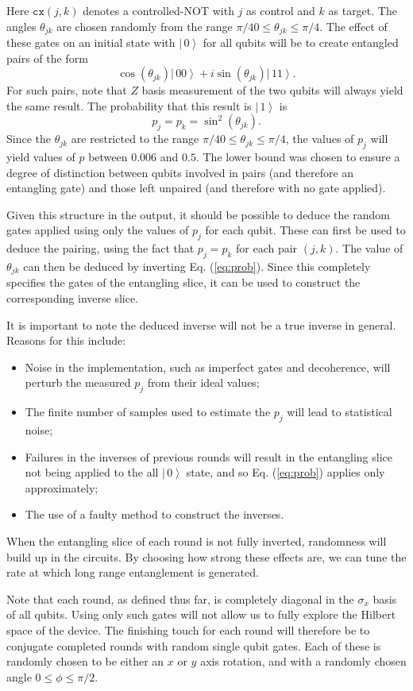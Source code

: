 \documentclass[aps,prl,twocolumn,showpacs,preprintnumbers]{revtex4-1}
\newcommand{\be}{\begin{equation}}
\newcommand{\ee}{\end{equation}}
\newcommand{\ket}[1]{\left | \, #1 \right\rangle}
\begin{document}
Here $\mathtt{cx}(j,k)$ denotes a controlled-NOT with $j$ as control and $k$ as target. The angles $\theta_{jk}$ are chosen randomly from the range $\pi/40 \leq \theta_{jk} \leq \pi/4$. The effect of these gates on an initial state with $\ket{0}$ for all qubits will be to create entangled pairs of the form
\be \label{state}
\cos (\theta_{jk}) \ket{00} + i \sin (\theta_{jk}) \ket{11} .
\ee
For such pairs, note that $Z$ basis measurement of the two qubits will always yield the same result. The probability that this result is $\ket{1}$ is
\be \label{eq:prob}
p_j = p_k = \sin^2 (\theta_{jk}).
\ee
Since the $\theta_{jk}$ are restricted to the range $\pi/40 \leq \theta_{jk} \leq \pi/4$, the values of $p_j$ will yield values of $p$ between $0.006$ and $0.5$. The lower bound was chosen to ensure a degree of distinction between qubits involved in pairs (and therefore an entangling gate) and those left unpaired (and therefore with no gate applied).

Given this structure in the output, it should be possible to deduce the random gates applied using only the values of $p_j$ for each qubit. These can first be used to deduce the pairing, using the fact that $p_j=p_k$ for each pair $(j,k)$. The value of $\theta_{jk}$ can then be deduced by inverting Eq. (\ref{eq:prob}). Since this completely specifies the gates of the entangling slice, it can be used to construct the corresponding inverse slice.

It is important to note the deduced inverse will not be a true inverse in general. Reasons for this include:
\begin{itemize}
\item Noise in the implementation, such as imperfect gates and decoherence, will perturb the measured $p_j$ from their ideal values;
\item The finite number of samples used to estimate the $p_j$ will lead to statistical noise;
\item Failures in the inverses of previous rounds will result in the entangling slice not being applied to the all $\ket{0}$ state, and so Eq. (\ref{eq:prob}) applies only approximately;
\item The use of a faulty method to construct the inverses.
\end{itemize}
When the entangling slice of each round is not fully inverted, randomness will build up in the circuits. By choosing how strong these effects are, we can tune the rate at which long range entanglement is generated.

Note that each round, as defined thus far, is completely diagonal in the $\sigma_x$ basis of all qubits. Using only such gates will not allow us to fully explore the Hilbert space of the device. The finishing touch for each round will therefore be to conjugate completed rounds with random single qubit gates. Each of these is randomly chosen to be either an $x$ or $y$ axis rotation, and with a randomly chosen angle $0\leq\phi\leq\pi/2$.
\end{document}
